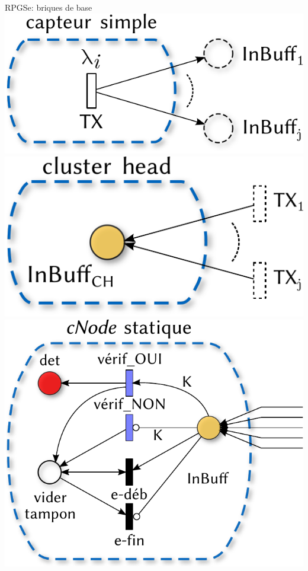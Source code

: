\documentclass[aspectratio=43]{beamer} %
\begin{document}
\begin{frame}{RPGSe: briques de base}
  \centering
  \includegraphics[height=.3\textheight]{Figs/RPSGe_sensing.pdf}
  \hfill
  \includegraphics[height=.3\textheight]{Figs/RPSGe_CH.pdf}
  \vfill
  \includegraphics[height=.5\textheight]{Figs/RPSGe_cNode_static.pdf}
\end{frame}
\end{document}
